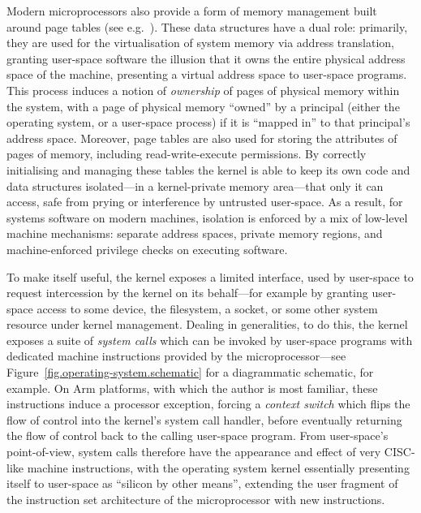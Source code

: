 \documentclass[a4paper, UKenglish, cleveref, autoref, thm-restate, colorlinks]{lipics-v2021}
\begin{document}
Modern microprocessors also provide a form of memory management built around page tables (see e.g.~\cite{arm-vmsa}).
These data structures have a dual role: primarily, they are used for the virtualisation of system memory via address translation, granting user-space software the illusion that it owns the entire physical address space of the machine, presenting a virtual address space to user-space programs.
This process induces a notion of \emph{ownership} of pages of physical memory within the system, with a page of physical memory ``owned'' by a principal (either the operating system, or a user-space process) if it is ``mapped in'' to that principal's address space.
Moreover, page tables are also used for storing the attributes of pages of memory, including read-write-execute permissions.
By correctly initialising and managing these tables the kernel is able to keep its own code and data structures isolated---in a kernel-private memory area---that only it can access, safe from prying or interference by untrusted user-space.
As a result, for systems software on modern machines, isolation is enforced by a mix of low-level machine mechanisms: separate address spaces, private memory regions, and machine-enforced privilege checks on executing software.

To make itself useful, the kernel exposes a limited interface, used by user-space to request intercession by the kernel on its behalf---for example by granting user-space access to some device, the filesystem, a socket, or some other system resource under kernel management.
Dealing in generalities, to do this, the kernel exposes a suite of \emph{system calls} which can be invoked by user-space programs with dedicated machine instructions provided by the microprocessor---see Figure~\ref{fig.operating-system.schematic} for a diagrammatic schematic, for example.
On Arm platforms, with which the author is most familiar, these instructions induce a processor exception, forcing a \emph{context switch} which flips the flow of control into the kernel's system call handler, before eventually returning the flow of control back to the calling user-space program.
From user-space's point-of-view, system calls therefore have the appearance and effect of very CISC-like machine instructions, with the operating system kernel essentially presenting itself to user-space as ``silicon by other means'', extending the user fragment of the instruction set architecture of the microprocessor with new instructions.
\end{document}
